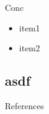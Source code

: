 

% 




\justifying
{\rmfamily

}


\justifying
{\rmfamily
% 
Conc
\begin{itemize}
    \item item1
    \item item2
\end{itemize}

}
      
\subsection{asdf}
\begin{block}{References}
\small{
\vspace{0.4cm}}
\end{block}
